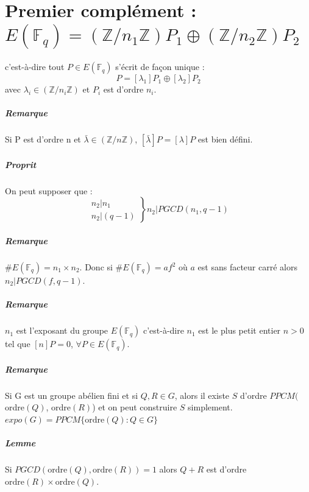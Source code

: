 \documentclass[12pt,a4paper]{report}
\begin{document}
\chapter{Premier complément : $E(\mathbb{F}_q)= (\mathbb{Z}/n_1\mathbb{Z})P_1 \oplus (\mathbb{Z}/n_2\mathbb{Z})P_2$}
c'est-à-dire tout $P \in E(\mathbb{F}_q) $ s'écrit de façon unique :
$$ P = [\lambda_1]P_1 \oplus [\lambda_2]P_2 $$
avec $\lambda_i  \in (\mathbb{Z}/n_i\mathbb{Z})$ et $P_i$ est d'ordre $n_i$.
\paragraph{Remarque\\}
Si P est d'ordre n et $\bar{\lambda} \in (\mathbb{Z}/n\mathbb{Z})$, $[\bar{\lambda}]P = [\lambda]P$ est bien défini.
\paragraph{Proprit\\}
On peut supposer que :
$$\left.\begin{array}{l}
n_2|n_1 \\
n_2 | (q-1) \end{array}\right\} n_2 |PGCD(n_1,q-1) $$
\paragraph{Remarque\\}
$\# E(\mathbb{F}_q) = n_1\times n_2$. Donc si $\# E(\mathbb{F}_q) =af^2$ où $a$ est sans facteur carré alors $n_2|PGCD(f,q-1)$.
\paragraph{Remarque\\}
$n_1$ est l'exposant du groupe $E(\mathbb{F}_q)$ c'est-à-dire $n_1$ est le plus petit entier $n>0$ tel que $[n]P=0$, $ \forall P \in E(\mathbb{F}_q)$.
\paragraph{Remarque\\}
Si G est un groupe abélien fini et si $Q,R \in G$, alors il existe $S$ d'ordre $PPCM($ordre$(Q)$, ordre$(R)$) et on peut construire $S$ simplement.\\
$ expo(G) = PPCM\{\mbox{ordre}(Q):Q\in G\}$
\paragraph{Lemme\\}
Si $PGCD(\mbox{ordre}(Q),\mbox{ordre}(R))=1$ alors $Q+R$ est d'ordre $\mbox{ordre}(R)\times  \mbox{ordre}(Q)$.
\end{document}
